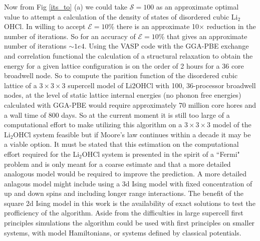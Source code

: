 \documentclass[aps,prl,reprint,superscriptaddress,showkeys]{revtex4-1}
\begin{document}
 Now from Fig \ref{its_to} (a) we could take $\mathcal{S}=100$  as an approximate optimal value to attempt a calculation of the density of states of disordered cubic Li$_2$OHCl. In willing to accept $\mathcal{E}=10\%$ there is an approximate 10$\times$ reduction in the number of iterations. So for an accuracy of $\mathcal{E}=10\%$ that gives an approximate number of iterations  $\sim 1e4$. Using the VASP code with the GGA-PBE exchange and correlation functional\cite{PBE} the calculation of a structural relaxation to obtain the energy for a given lattice configuration is on the order of 2 hours for a 36 core broadwell node. So to compute the parition function of the disordered cubic lattice of a $3\times 3 \times 3$ supercell model of Li2OHCl with 100,  36-processor broadwell nodes, at the level of static lattice internal energies (no phonon free energies) calculated with GGA-PBE  would require approximately  70 million core hores and a wall time of 800 days.   So at the current moment it is still  too large of a computational effort to make utilizing this algorithm on a $3\times  3 \times 3$ model of the Li$_2$OHCl system feasible but if Moore's law continues within a decade it may be a viable option. It must be stated that this estimation on the computational effort required for the Li$_2$OHCl system is presented in the spirit of a ``Fermi" problem and is only meant for a coarse estimate and that a more detailed analogous model would be required to improve the prediction. A more detailed anlagous model might include using a 3d Ising model with fixed concentration of up and down spins and including longer range interactions. The benefit of the square 2d Ising model in this work is the availability of exact solutions to test the profficiency of the algorithm. Aside from the difficulties in large supercell first principles simulations the algorithm could be used with first principles on smaller systems, with model Hamiltonians, or systems defined by classical potentials.  
\end{document}
